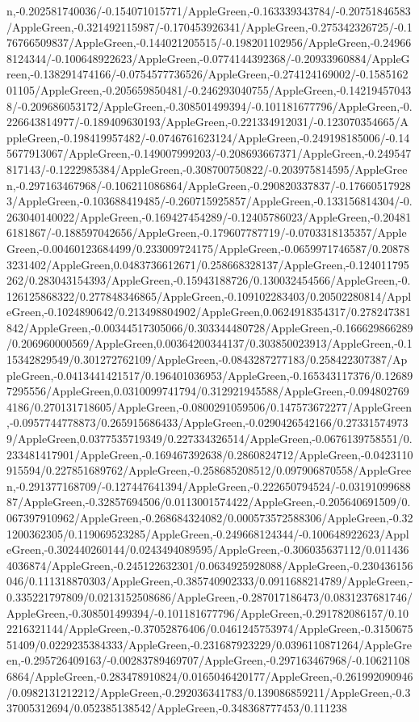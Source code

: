 {\begin{tikzternal}
{n,-0.202581740036/-0.154071015771/AppleGreen,-0.163339343784/-0.20751846583/AppleGreen,-0.321492115987/-0.170453926341/AppleGreen,-0.275342326725/-0.176766509837/AppleGreen,-0.144021205515/-0.198201102956/AppleGreen,-0.249668124344/-0.100648922623/AppleGreen,-0.0774144392368/-0.20933960884/AppleGreen,-0.138291474166/-0.0754577736526/AppleGreen,-0.274124169002/-0.158516201105/AppleGreen,-0.205659850481/-0.246293040755/AppleGreen,-0.142194570438/-0.209686053172/AppleGreen,-0.308501499394/-0.101181677796/AppleGreen,-0.226643814977/-0.189409630193/AppleGreen,-0.221334912031/-0.123070354665/AppleGreen,-0.198419957482/-0.0746761623124/AppleGreen,-0.249198185006/-0.145677913067/AppleGreen,-0.149007999203/-0.208693667371/AppleGreen,-0.249547817143/-0.1222985384/AppleGreen,-0.308700750822/-0.203975814595/AppleGreen,-0.297163467968/-0.106211086864/AppleGreen,-0.290820337837/-0.176605179283/AppleGreen,-0.103688419485/-0.260715925857/AppleGreen,-0.133156814304/-0.263040140022/AppleGreen,-0.169427454289/-0.12405786023/AppleGreen,-0.204816181867/-0.188597042656/AppleGreen,-0.179607787719/-0.0703318135357/AppleGreen,-0.00460123684499/0.233009724175/AppleGreen,-0.0659971746587/0.208783231402/AppleGreen,0.0483736612671/0.258668328137/AppleGreen,-0.124011795262/0.283043154393/AppleGreen,-0.15943188726/0.130032454566/AppleGreen,-0.126125868322/0.277848346865/AppleGreen,-0.109102283403/0.20502280814/AppleGreen,-0.1024890642/0.213498804902/AppleGreen,0.0624918354317/0.278247381842/AppleGreen,-0.00344517305066/0.303344480728/AppleGreen,-0.166629866289/0.206960000569/AppleGreen,0.00364200344137/0.303850023913/AppleGreen,-0.115342829549/0.301272762109/AppleGreen,-0.0843287277183/0.258422307387/AppleGreen,-0.0413441421517/0.196401036953/AppleGreen,-0.165343117376/0.126897295556/AppleGreen,0.0310099741794/0.312921945588/AppleGreen,-0.0948027694186/0.270131718605/AppleGreen,-0.0800291059506/0.147573672277/AppleGreen,-0.0957744778873/0.265915686433/AppleGreen,-0.0290426542166/0.273315749739/AppleGreen,0.0377535719349/0.227334326514/AppleGreen,-0.0676139758551/0.233481417901/AppleGreen,-0.169467392638/0.2860824712/AppleGreen,-0.0423110915594/0.227851689762/AppleGreen,-0.258685208512/0.097906870558/AppleGreen,-0.291377168709/-0.127447641394/AppleGreen,-0.222650794524/-0.0319109968887/AppleGreen,-0.32857694506/0.0113001574422/AppleGreen,-0.205640691509/0.067397910962/AppleGreen,-0.268684324082/0.000573572588306/AppleGreen,-0.321200362305/0.119069523285/AppleGreen,-0.249668124344/-0.100648922623/AppleGreen,-0.302440260144/0.0243494089595/AppleGreen,-0.306035637112/0.0114364036874/AppleGreen,-0.245122632301/0.0634925928088/AppleGreen,-0.230436156046/0.111318870303/AppleGreen,-0.385740902333/0.0911688214789/AppleGreen,-0.335221797809/0.0213152508686/AppleGreen,-0.287017186473/0.0831237681746/AppleGreen,-0.308501499394/-0.101181677796/AppleGreen,-0.291782086157/0.102216321144/AppleGreen,-0.37052876406/0.0461245753974/AppleGreen,-0.315067551409/0.0229235384333/AppleGreen,-0.231687923229/0.0396110871264/AppleGreen,-0.295726409163/-0.00283789469707/AppleGreen,-0.297163467968/-0.106211086864/AppleGreen,-0.283478910824/0.0165046420177/AppleGreen,-0.261992090946/0.0982131212212/AppleGreen,-0.292036341783/0.139086859211/AppleGreen,-0.337005312694/0.052385138542/AppleGreen,-0.348368777453/0.111238}
\end{tikzternal}}
